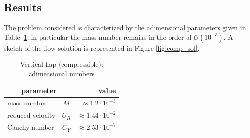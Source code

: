 \subsection{Results}

The problem considered is characterized by the adimensional parameters given in Table~\ref{table:comp-adim}: in particular the mass number remains in the order of $\mathcal{O} \left(10^{-3}\right)$. A sketch of the flow solution is represented in Figure \ref{fig:comp_sol}.

\begin{table}[!htb]
	\begin{center}
		\begin{tabular}{ l c | r } 
			\multicolumn{2}{c|}{parameter} & value   \\ 
			\hline
			mass number  & $M$ & $ \approx 1.2\cdot 10^{-3}$     \\
			reduced velocity & $U_R$ & $ \approx 1.44\cdot 10^{-2}$  \\
			Cauchy number  & $C_Y$ & $  \approx 2.53 \cdot 10^{-7}$  \\			
		\end{tabular}
	\end{center}
	\caption{Vertical flap (compressible): adimensional numbers}
	\label{table:comp-adim}
\end{table}

